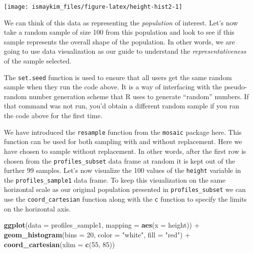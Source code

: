 \documentclass[]{tufte-book}
\newenvironment{Shaded}{\begin{snugshade}}{\end{snugshade}}
\newcommand{\KeywordTok}[1]{\textcolor[rgb]{0.13,0.29,0.53}{\textbf{{#1}}}}
\newcommand{\DataTypeTok}[1]{\textcolor[rgb]{0.13,0.29,0.53}{{#1}}}
\newcommand{\DecValTok}[1]{\textcolor[rgb]{0.00,0.00,0.81}{{#1}}}
\newcommand{\StringTok}[1]{\textcolor[rgb]{0.31,0.60,0.02}{{#1}}}
\newcommand{\OtherTok}[1]{\textcolor[rgb]{0.56,0.35,0.01}{{#1}}}
\newcommand{\NormalTok}[1]{{#1}}
\begin{document}
\begin{center}\texttt{[image: ismaykim\_files/figure-latex/height-hist2-1]} \end{center}

We can think of this data as representing the \emph{population} of
interest. Let's now take a random sample of size 100 from this
population and look to see if this sample represents the overall shape
of the population. In other words, we are going to use data
visualization as our guide to understand the \emph{representativeness}
of the sample selected.

\begin{Shaded}
\end{Shaded}

The \texttt{set.seed} function is used to ensure that all users get the
same random sample when they run the code above. It is a way of
interfacing with the pseudo-random number generation scheme that R uses
to generate ``random'' numbers. If that command was not run, you'd
obtain a different random sample if you ran the code above for the first
time.

We have introduced the \texttt{resample} function from the
\texttt{mosaic} package here. This function can be used for both
sampling with and without replacement. Here we have chosen to sample
without replacement. In other words, after the first row is chosen from
the \texttt{profiles\_subset} data frame at random it is kept out of the
further 99 samples. Let's now visualize the 100 values of the
\texttt{height} variable in the \texttt{profiles\_sample1} data frame.
To keep this visualization on the same horizontal scale as our original
population presented in \texttt{profiles\_subset} we can use the
\texttt{coord\_cartesian} function along with the \texttt{c} function to
specify the limits on the horizontal axis.

\begin{Shaded}
\begin{Highlighting}[]
\KeywordTok{ggplot}\NormalTok{(}\DataTypeTok{data =} \NormalTok{profiles_sample1, }\DataTypeTok{mapping =} \KeywordTok{aes}\NormalTok{(}\DataTypeTok{x =} \NormalTok{height)) +}
\StringTok{  }\KeywordTok{geom_histogram}\NormalTok{(}\DataTypeTok{bins =} \DecValTok{20}\NormalTok{, }\DataTypeTok{color =} \StringTok{"white"}\NormalTok{, }\DataTypeTok{fill =} \StringTok{"red"}\NormalTok{) +}
\StringTok{  }\KeywordTok{coord_cartesian}\NormalTok{(}\DataTypeTok{xlim =} \KeywordTok{c}\NormalTok{(}\DecValTok{55}\NormalTok{, }\DecValTok{85}\NormalTok{))}
\end{Highlighting}
\end{Shaded}
\end{document}
